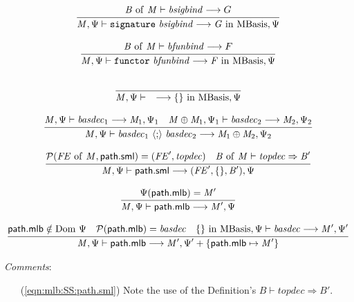\documentclass[draft]{article}
\renewcommand{\mit}[1]{\mathit{#1}}
\newcommand{\mrm}[1]{\mathrm{#1}}
\newcommand{\mtt}[1]{\mathtt{#1}}
\newcommand{\mcal}[1]{\mathcal{#1}}
\newcommand{\msf}[1]{\mathsf{#1}}
\newcommand{\infrule}[2]{{\frac{\displaystyle\strut{#1}}{\displaystyle\strut{#2}}}}
\newcommand{\judge}[2]{\infrule{#1}{#2}}
\begin{document}
\begin{equation}
\judge{
\mit{B}~\mrm{of}~\mit{M} \vdash \mit{bsigbind} \longrightarrow G
}{
\mit{M}, \Psi  \vdash \mtt{signature}~ \mit{bsigbind}
\longrightarrow \mit{G } ~\mrm{in}~ \mrm{MBasis}, \Psi
}
\end{equation}

\begin{equation}
\judge{
\mit{B}~\mrm{of}~\mit{M} \vdash \mit{bfunbind} \longrightarrow F
}{
\mit{M}, \Psi  \vdash \mtt{functor}~ \mit{bfunbind}
\longrightarrow \mit{F} ~\mrm{in}~ \mrm{MBasis}, \Psi
}
\end{equation}

\begin{equation}
\judge{
}{
\mit{M}, \Psi  \vdash \quad \longrightarrow \{\} ~\mrm{in}~ \mrm{MBasis}, \Psi
}
\end{equation}

\begin{equation}
\judge{
\mit{M}, \Psi  \vdash \mit{basdec}_1 \longrightarrow \mit{M}_1, \Psi_1 \quad
\mit{M} \oplus \mit{M}_1, \Psi_1  \vdash \mit{basdec}_2 \longrightarrow \mit{M}_2, \Psi_2 
}{
\mit{M}, \Psi  \vdash \mit{basdec}_1 ~\langle\mtt{;}\rangle~ \mit{basdec}_2 \longrightarrow \mit{M}_1 \oplus \mit{M}_2, \Psi_2
}
\end{equation}

\begin{equation}
\label{eqn:mlb:SS:path.sml}
\judge{
\mcal{P}(\mit{FE}~\mrm{of}~\mit{M}, \msf{path.sml}) = (\mit{FE}', \mit{topdec}) \quad
\mit{B}~\mrm{of}~\mit{M} \vdash \mit{topdec} \Rightarrow \mit{B}'
}{
\mit{M}, \Psi  \vdash \msf{path.sml}  \longrightarrow (\mit{FE}',\{\},\mit{B}'), \Psi
}
\end{equation}

\begin{equation}
\judge{
\Psi(\msf{path.mlb}) = \mit{M}'
}{
\mit{M}, \Psi  \vdash \msf{path.mlb}  \longrightarrow \mit{M}', \Psi
}
\end{equation}

\begin{equation}
\judge{
\msf{path.mlb} \notin \mrm{Dom}~\Psi \quad
\mcal{P}(\msf{path.mlb}) = \mit{basdec} \quad
\{\} ~\mrm{in}~ \mrm{MBasis}, \Psi  \vdash \mit{basdec} \longrightarrow \mit{M}', \Psi'
}{
\mit{M}, \Psi  \vdash \msf{path.mlb}  \longrightarrow \mit{M}', \Psi' + \{\msf{path.mlb} \mapsto \mit{M}'\} 
}
\end{equation}

\begin{samepage}
\noindent
\textit{Comments}:
\begin{itemize}
\item[(\ref{eqn:mlb:SS:path.sml})] 
Note the use of the Definition's 
$\mit{B} \vdash \mit{topdec} \Rightarrow \mit{B}'$.
\end{itemize}
\end{samepage}
\end{document}

